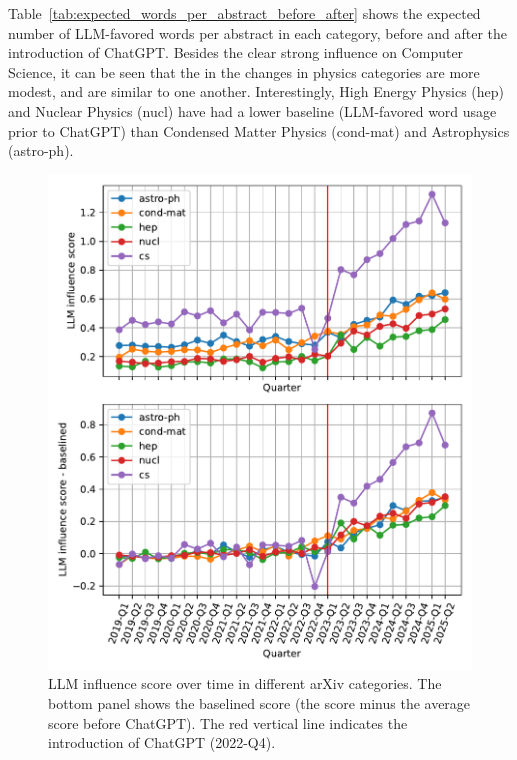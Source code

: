 \documentclass[twocolumn]{aastex701}
\begin{document}
Table~\ref{tab:expected_words_per_abstract_before_after} shows the expected number of LLM-favored words per abstract in each category, before and after the introduction of ChatGPT.
Besides the clear strong influence on Computer Science, it can be seen that the in the changes in physics categories are more modest, and are similar to one another.
Interestingly, High Energy Physics (hep) and Nuclear Physics (nucl) have had a lower baseline (LLM-favored word usage prior to ChatGPT) than Condensed Matter Physics (cond-mat) and Astrophysics (astro-ph).


\begin{figure}[h]
\centering
\includegraphics[width=\columnwidth]{scripts/figs/major_cats_score_vs_time.pdf}
\caption{
LLM influence score over time in different arXiv categories.
The bottom panel shows the baselined score (the score minus the average score before ChatGPT).
The red vertical line indicates the introduction of ChatGPT (2022-Q4).
}
\label{fig:category_comparison}
\end{figure}
\end{document}
